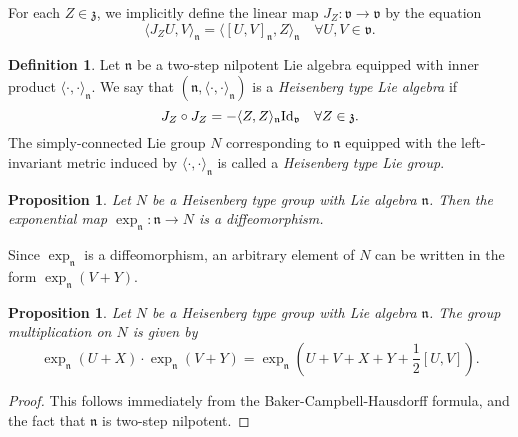 \documentclass{amsart}
\newcommand{\id}{\text{\normalfont Id}}
\renewcommand{\v}{\mathfrak v}
\newcommand{\z}{\mathfrak z}
\newcommand{\n}{\mathfrak n}
\theoremstyle{plain}
\newtheorem{proposition}[theorem]{Proposition}
\theoremstyle{definition}
\newtheorem{definition}[theorem]{Definition}
\theoremstyle{remark}
\begin{document}
	
	For each $Z \in \z$, we implicitly define the linear map $J_Z: \v \rightarrow \v$ by the equation
	$$\langle J_Z U,V \rangle_{\n} = \langle [U,V]_{\n},Z\rangle_{\n} \quad \forall U,V\in \v.$$
	
	
	\begin{definition}
		Let $\n$ be a two-step nilpotent Lie algebra equipped with inner product $\langle \cdot ,\cdot \rangle_{\n}$. We say that $(\n, \langle \cdot ,\cdot \rangle_{\n})$ is a \emph{Heisenberg type Lie algebra} if 
		\begin{equation}
			J_Z \circ J_Z = - \langle Z,Z \rangle_{\n} \id_{\v} \quad \forall Z \in \z. \label{J squared}
		\end{equation}
		The simply-connected Lie group $N$ corresponding to $\n$ equipped with the left-invariant metric induced by $\langle\cdot, \cdot \rangle_{\n}$ is called a \emph{Heisenberg type Lie group}.
	\end{definition}
	
	
	\begin{proposition}
		Let $N$ be a Heisenberg type group with Lie algebra $\n$. Then the exponential map $\exp_{\n}:\n \rightarrow N$ is a diffeomorphism.
	\end{proposition}

	
	Since $\exp_{\n}$ is a diffeomorphism, an arbitrary element of $N$ can be written in the form $\exp_{\n}(V+Y)$.
	
	\begin{proposition}
		\label{multiplication in N}
		Let $N$ be a Heisenberg type group with Lie algebra $\n$. The group multiplication on $N$ is given by 
		$$\exp_\n(U+X) \cdot \exp_\n(V+Y) = \exp_\n\left(U+V + X + Y + \frac12 [U,V]\right).$$
	\end{proposition}
	\begin{proof}
		This follows immediately from the Baker-Campbell-Hausdorff formula, and the fact that $\n$ is two-step nilpotent.
	\end{proof}
	
\end{document}
